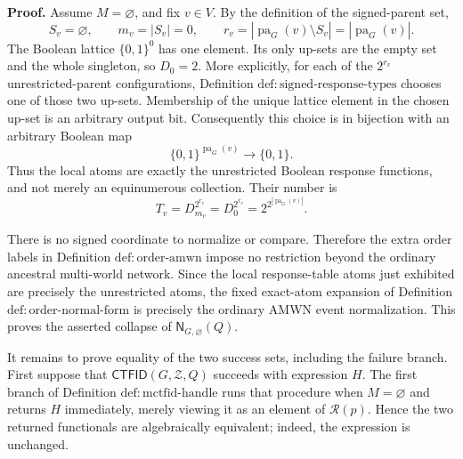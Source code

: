 \textbf{Proof.}
Assume \(M=\varnothing\), and fix \(v\in V\). By the definition of the signed-parent set,
\[
 S_v=\varnothing,
 \qquad
 m_v=|S_v|=0,
 \qquad
 r_v=|\operatorname{pa}_G(v)\setminus S_v|
     =|\operatorname{pa}_G(v)|.
\]
The Boolean lattice \(\{0,1\}^{0}\) has one element. Its only up-sets are the empty set and the whole singleton, so \(D_0=2\). More explicitly, for each of the \(2^{r_v}\) unrestricted-parent configurations, Definition \(\mathrm{def:signed\text{-}response\text{-}types}\) chooses one of those two up-sets. Membership of the unique lattice element in the chosen up-set is an arbitrary output bit. Consequently this choice is in bijection with an arbitrary Boolean map
\[
 \{0,1\}^{\operatorname{pa}_G(v)}\longrightarrow\{0,1\}.
\]
Thus the local atoms are exactly the unrestricted Boolean response functions, and not merely an equinumerous collection. Their number is
\[
 T_v=D_{m_v}^{2^{r_v}}
     =D_0^{2^{r_v}}
     =2^{2^{|\operatorname{pa}_G(v)|}}.
\]

There is no signed coordinate to normalize or compare. Therefore the extra order labels in Definition \(\mathrm{def:order\text{-}amwn}\) impose no restriction beyond the ordinary ancestral multi-world network. Since the local response-table atoms just exhibited are precisely the unrestricted atoms, the fixed exact-atom expansion of Definition \(\mathrm{def:order\text{-}normal\text{-}form}\) is precisely the ordinary AMWN event normalization. This proves the asserted collapse of \(\mathsf N_{G,\varnothing}(Q)\).

It remains to prove equality of the two success sets, including the failure branch. First suppose that \(\mathsf{CTFID}(G,\mathcal Z,Q)\) succeeds with expression \(H\). The first branch of Definition \(\mathrm{def:mctfid\text{-}handle}\) runs that procedure when \(M=\varnothing\) and returns \(H\) immediately, merely viewing it as an element of \(\mathcal R(p)\). Hence the two returned functionals are algebraically equivalent; indeed, the expression is unchanged.

